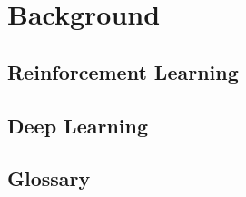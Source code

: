 \section{Background}
\subsection{Reinforcement Learning}




\subsection{Deep Learning}\label{sec:deep_learn}


\subsection{Glossary}


